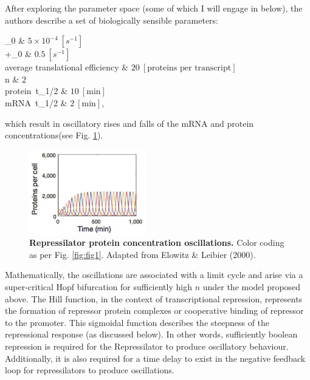 \documentclass[runningheads,a4paper]{llncs}
\makeatletter
\newenvironment{conditions}
  {\par\setlength{\leftskip}{1cm}\vspace{\abovedisplayskip}\noindent
   \tabularx{0.9\columnwidth}{>{$}l<{$} @{${}\ =\ {}$} >{\raggedright\arraybackslash}X}}
  {\endtabularx\par\setlength{\leftskip}{1cm}\vspace{\belowdisplayskip}}
\makeatother
\begin{document}
After exploring the parameter space (some of which I will engage in below), the authors describe a set of biologically sensible parameters:

\begin{conditions}
    \alpha_{0}                                  &   $5\times 10^{-4}\ [s^{-1}]$  \\
    \alpha+\alpha_{0}                           &   $0.5\ [s^{-1}]$    \\
    \textrm{average translational efficiency}   &   $20\ [\textrm{proteins per transcript}]$  \\
    n                                           &   $2$   \\
    \textrm{protein}\ t_{1/2}                   &   $10\ [\textrm{min}]$    \\
    \textrm{mRNA}\ t_{1/2}                      &   $2\ [\textrm{min}]$, \\
\end{conditions}

\noindent which result in oscillatory rises and falls of the mRNA and protein concentrations\linebreak (see Fig. \ref{fig:fig2})\cite{Elowitz2000d}.

\begin{figure}
    \singlespacing
    \centering
    \includegraphics[width=0.45\textwidth]{fig/original_oscilations.png}
    \caption{\textbf{Repressilator protein concentration oscillations.} Color coding as per Fig. \ref{fig:fig1}. Adapted from Elowitz \& Leibier (2000)\cite{Elowitz2000d}.}
    \label{fig:fig2}
\end{figure}

Mathematically, the oscillations are associated with a limit cycle and arise via a super-critical Hopf bifurcation for sufficiently high $n$ under the model proposed above\cite{Purcell2010a, Muller2006, Elowitz2000d}. The Hill function, in the context of transcriptional repression, represents the formation of repressor protein complexes or cooperative binding of repressor to the promoter\cite{Gonze2013a}. This sigmoidal function describes the steepness of the repressional response (as discussed below). In other words, sufficiently boolean repression is required for the Repressilator to produce oscillatory behaviour\cite{Purcell2010a}. Additionally, it is also required for a time delay to exist in the negative feedback loop for repressilators to produce oscillations\cite{Purcell2010a,Gonze2020}.
\end{document}
